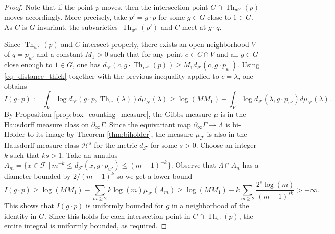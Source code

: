 \documentclass[12pt]{amsbook}%
\theoremstyle{definition}
\theoremstyle{remark}
\numberwithin{section}{chapter}
\numberwithin{subsection}{section}
\numberwithin{figure}{chapter}
\DeclareMathOperator{\Th}{Th}
\def\cF{{\mathscr{F}}}
\begin{document}
{{\begin{proof}
  Note that if the point $p$ moves, then the intersection point $C\cap \Th_{w^\vee}(p)$ moves accordingly. More precisely, take $p' = g \cdot p$ for some $g \in G$ close to $1\in G$.
{As $C$ is $G$-invariant, the subvarieties $\Th_{w^\vee}(p')$ and $ C $ meet at $g \cdot q$.}  
   
  Since $\Th_{w^\vee}(p)$ and $C$ intersect properly, there exists an open neighborhood $V$ of $q=p_{w'}$ and a constant $M_1> 0$ such that for any point ${c} \in C \cap V$ and all $g\in G$ close enough to $1\in G$, one has $d_{\cF}(c, {g\cdot} \Th_{w^\vee}(p)) \geqslant M_1 d_{\cF}({c}, {g\cdot} p_{w'})$. Using \eqref{eq_distance_thick} together with the previous inequality applied to $c =\lambda$, one obtains  
  \begin{equation*} 
I(g\cdot p):=  \int_V \log d_{\cF}( g\cdot p , \Th_w(\lambda)) d\mu_{\cF}(\lambda) \geqslant \log (MM_1)  + \int_V \log d_{\cF}(\lambda,g\cdot  p_{w'}) d\mu_{\cF}(\lambda).  
  \end{equation*}
 By Proposition \ref{prop:box_counting_measure},  the Gibbs measure $\mu$ is in the Hausdorff measure class on   
 $\partial_\infty \Gamma$.  Since  the equivariant map $\partial_\infty \Gamma \to \Lambda$ is bi-H{\o}lder to its image by Theorem \ref{thm:biholder}, the measure $\mu_{\cF}$ is also in the Hausdorff measure class $\mathcal{H}^s$ for the metric $d_{\cF}$ 
 for some $s> 0$. Choose an integer $k$ such that $ k s > 1$. 
Take an annulus $A_m = \{ x \in \cF \ | \ m^{-k} \leqslant  d_{\cF}(x,g\cdot p_{w'}) \leqslant
 (m-1)^{-k}  \}$. Observe that  $\Lambda \cap A_n$ has a diameter bounded by $2/(m-1)^k$ so we get   a lower bound 
 \begin{equation*}
 I(g\cdot p) \geqslant \log (M M_1)  - \sum_{m\geqslant 2} k \log (m) \mu_{\cF}(A_m) \geqslant \log (M M_1) - k \sum_{m\geqslant 2} \dfrac{2^{s}\log(m)}{(m-1)^{s k}} > -\infty.    
\end{equation*}
This shows that $I(g\cdot p)$ is uniformly bounded for $g$ in a neighborhood of the identity in $G$. Since this holds for each intersection point in $C \cap \Th_w(p)$, the entire integral is uniformly bounded, as required. 
\end{proof}






}}
\end{document}
